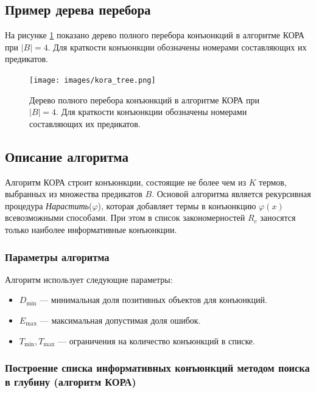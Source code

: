 \subsection{Пример дерева перебора}

На рисунке \ref{fig:kora_tree} показано дерево полного перебора конъюнкций в алгоритме КОРА при \(|B| = 4\). Для краткости конъюнкции обозначены номерами составляющих их предикатов.

\begin{figure}[h]
    \centering
    \texttt{[image: images/kora\_tree.png]}
    \caption{Дерево полного перебора конъюнкций в алгоритме КОРА при \(|B| = 4\). Для краткости конъюнкции обозначены номерами составляющих их предикатов.}
    \label{fig:kora_tree}
\end{figure}

\subsection{Описание алгоритма}

Алгоритм КОРА строит конъюнкции, состоящие не более чем из \(K\) термов, выбранных из множества предикатов \(B\). Основой алгоритма является рекурсивная процедура \textit{Нарастить}(\(\varphi\)), которая добавляет термы в конъюнкцию \(\varphi(x)\) всевозможными способами. При этом в список закономерностей \(R_c\) заносятся только наиболее информативные конъюнкции.

\subsubsection{Параметры алгоритма}

Алгоритм использует следующие параметры:

\begin{itemize}
    \item \(D_{\text{min}}\) — минимальная доля позитивных объектов для конъюнкций.
    \item \(E_{\text{max}}\) — максимальная допустимая доля ошибок.
    \item \(T_{\text{min}}, T_{\text{max}}\) — ограничения на количество конъюнкций в списке.
\end{itemize}

\subsubsection{Построение списка информативных конъюнкций методом поиска в глубину (алгоритм КОРА)}

